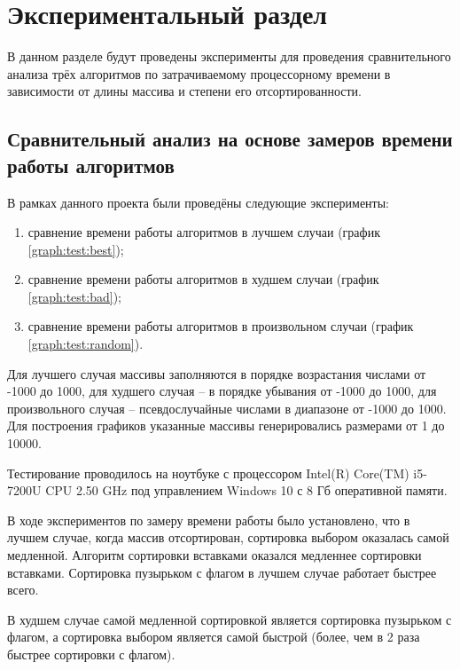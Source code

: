 \chapter{Экспериментальный раздел}
\label{cha:research}
    В данном разделе будут проведены эксперименты для проведения 
    сравнительного анализа трёх алгоритмов по затрачиваемому процессорному 
    времени в зависимости от длины массива и степени его отсортированности.

    \section{Сравнительный анализ на основе замеров времени работы алгоритмов}
        В рамках данного проекта были проведёны следующие эксперименты:
        \begin{enumerate}
            \item сравнение времени работы алгоритмов в лучшем случаи (график \ref{graph:test:best});
            \item сравнение времени работы алгоритмов в худшем случаи (график \ref{graph:test:bad});
            \item сравнение времени работы алгоритмов в произвольном случаи (график \ref{graph:test:random}).
        \end{enumerate}

        Для лучшего случая массивы заполняются в порядке возрастания числами от -1000 до 1000,
        для худшего случая -- в порядке убывания от -1000 до 1000, для произвольного случая --
        псевдослучайные числами в диапазоне от -1000 до 1000. Для построения графиков 
        указанные массивы генерировались размерами от 1 до 10000.

        Тестирование проводилось на ноутбуке с процессором
        Intel(R) Core(TM) i5-7200U CPU 2.50 GHz \cite{processor-i5-7200u}
        под управлением Windows 10 с 8 Гб оперативной памяти.

        В ходе экспериментов по замеру времени работы было установлено, что 
        в лучшем случае, когда массив отсортирован, сортировка выбором оказалась самой медленной.
        Алгоритм сортировки вставками оказался медленнее сортировки вставками.
        Сортировка пузырьком с флагом в лучшем случае работает быстрее всего.

        В худшем случае самой медленной сортировкой является сортировка пузырьком с флагом,
        а сортировка выбором является самой быстрой (более, чем в 2 раза быстрее сортировки с флагом).

